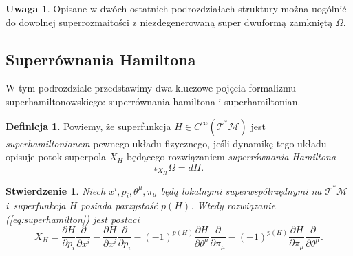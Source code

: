 \documentclass[11pt,a4paper]{report}
\newtheorem{proposition}[theorem]{Stwierdzenie}
\theoremstyle{definition}
\newtheorem{definition}[theorem]{Definicja}
\newtheorem{remark}[theorem]{Uwaga}
\begin{document}
\begin{remark}
	Opisane w dwóch ostatnich podrozdziałach struktury można uogólnić do dowolnej superrozmaitości z niezdegenerowaną super dwuformą zamkniętą $\Omega$.
\end{remark}
			      				
\subsection{Superrównania Hamiltona}
			      				
W tym podrozdziale przedstawimy dwa kluczowe pojęcia formalizmu superhamiltonowskiego: superrównania hamiltona i superhamiltonian.
			      				
\begin{definition}
	Powiemy, że superfunkcja $H \in C^\infty(\mathcal{T^*M})$ jest \textit{superhamiltonianem} pewnego układu fizycznego, jeśli dynamikę tego układu opisuje potok superpola $X_H$ będącego rozwiązaniem \textit{superrównania Hamiltona}
	\begin{equation}
		\label{eq:superhamilton}
		\iota_{X_H} \Omega = dH.
	\end{equation}
\end{definition}
			      				
\begin{proposition}
	Niech $x^i, p_i, \theta^\mu, \pi_\mu$ będą lokalnymi superwspółrzędnymi na $\mathcal{T^*M}$ i~superfunkcja $H$ posiada parzystość $p(H)$. Wtedy rozwiązanie (\ref{eq:superhamilton}) jest postaci
	\begin{equation*}
		X_H = \frac{\partial H}{\partial p_i} \frac{\partial}{\partial x^i} 
		- \frac{\partial H}{\partial x^i} \frac{\partial}{\partial p_i}
		-(-1)^{p(H)} \frac{\partial H}{\partial \theta^\mu} \frac{\partial}{\partial \pi_\mu}
		-(-1)^{p(H)} \frac{\partial H}{\partial \pi_\mu} \frac{\partial}{\partial \theta^\mu}.
	\end{equation*}
\end{proposition}
			      				
\end{document}
